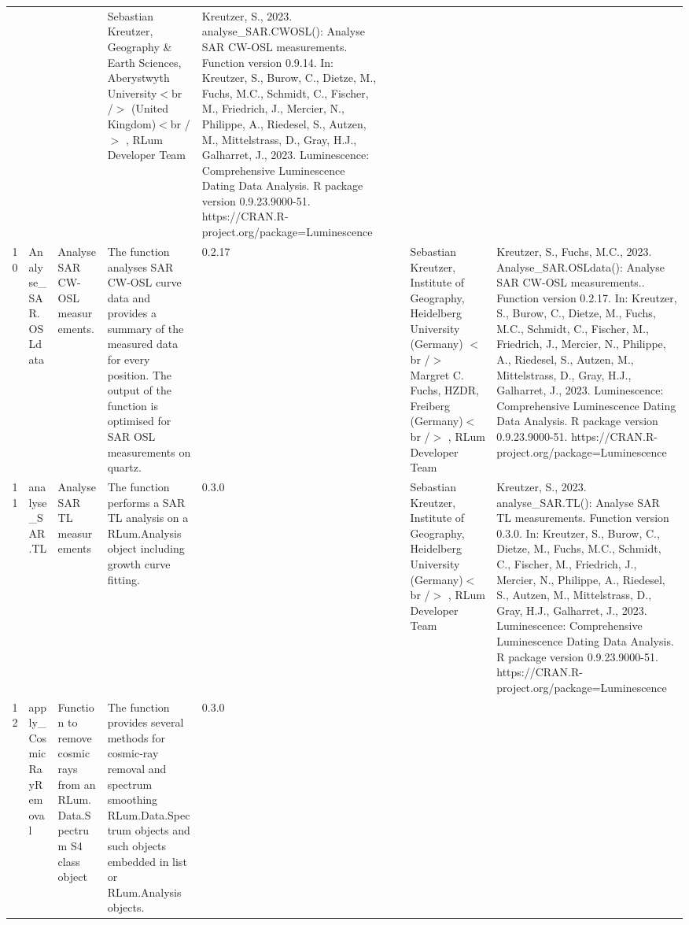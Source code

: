 \begin{table}[ht]
\begin{tabular}{rllllllll}
 &  &  & Sebastian Kreutzer, Geography \& Earth Sciences, Aberystwyth University$<$br /$>$ (United Kingdom)$<$br /$>$ , RLum Developer Team & Kreutzer, S., 2023. analyse\_SAR.CWOSL(): Analyse SAR CW-OSL measurements. Function version 0.9.14. In: Kreutzer, S., Burow, C., Dietze, M., Fuchs, M.C., Schmidt, C., Fischer, M., Friedrich, J., Mercier, N., Philippe, A., Riedesel, S., Autzen, M., Mittelstrass, D., Gray, H.J., Galharret, J., 2023. Luminescence: Comprehensive Luminescence Dating Data Analysis. R package version 0.9.23.9000-51. https://CRAN.R-project.org/package=Luminescence
 \\ 
  10 & Analyse\_SAR.OSLdata & Analyse SAR CW-OSL measurements. & The function analyses SAR CW-OSL curve data and provides a summary of the measured data for every position. The output of the function is optimised for SAR OSL measurements on quartz. & 0.2.17
 &  &  & Sebastian Kreutzer, Institute of Geography, Heidelberg University (Germany) $<$br /$>$ Margret C. Fuchs, HZDR, Freiberg (Germany)$<$br /$>$ , RLum Developer Team & Kreutzer, S., Fuchs, M.C., 2023. Analyse\_SAR.OSLdata(): Analyse SAR CW-OSL measurements.. Function version 0.2.17. In: Kreutzer, S., Burow, C., Dietze, M., Fuchs, M.C., Schmidt, C., Fischer, M., Friedrich, J., Mercier, N., Philippe, A., Riedesel, S., Autzen, M., Mittelstrass, D., Gray, H.J., Galharret, J., 2023. Luminescence: Comprehensive Luminescence Dating Data Analysis. R package version 0.9.23.9000-51. https://CRAN.R-project.org/package=Luminescence
 \\ 
  11 & analyse\_SAR.TL & Analyse SAR TL measurements & The function performs a SAR TL analysis on a RLum.Analysis  object including growth curve fitting. & 0.3.0
 &  &  & Sebastian Kreutzer, Institute of Geography, Heidelberg University (Germany)$<$br /$>$ , RLum Developer Team & Kreutzer, S., 2023. analyse\_SAR.TL(): Analyse SAR TL measurements. Function version 0.3.0. In: Kreutzer, S., Burow, C., Dietze, M., Fuchs, M.C., Schmidt, C., Fischer, M., Friedrich, J., Mercier, N., Philippe, A., Riedesel, S., Autzen, M., Mittelstrass, D., Gray, H.J., Galharret, J., 2023. Luminescence: Comprehensive Luminescence Dating Data Analysis. R package version 0.9.23.9000-51. https://CRAN.R-project.org/package=Luminescence
 \\ 
  12 & apply\_CosmicRayRemoval & Function to remove cosmic rays from an RLum.Data.Spectrum S4 class object & The function provides several methods for cosmic-ray removal and spectrum smoothing  RLum.Data.Spectrum  objects and such objects embedded in  list  or RLum.Analysis  objects. & 0.3.0

\end{tabular}
\end{table}
